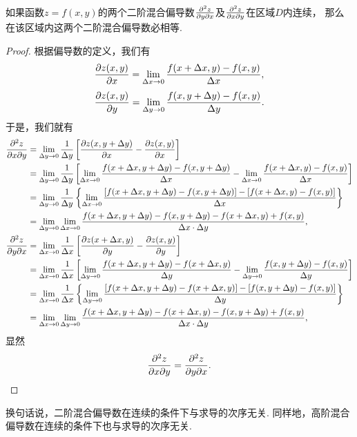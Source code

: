 \begin{theorem}
如果函数\(z=f(x,y)\)的两个二阶混合偏导数\(\pdv{z}{y}{x}\)及\(\pdv{z}{x}{y}\)在区域\(D\)内连续，
那么在该区域内这两个二阶混合偏导数必相等.
\begin{proof}
根据偏导数的定义，我们有
\[
	\pdv{z(x,y)}{x}
	= \lim\limits_{\Delta x\to0} \frac{f(x+\Delta x,y)-f(x,y)}{\Delta x},
\]
	\[
	\pdv{z(x,y)}{y}
	= \lim\limits_{\Delta y\to0} \frac{f(x,y+\Delta y)-f(x,y)}{\Delta y}.
\]
于是，我们就有
\begin{align*}
	\pdv[2]{z}{x}{y}
	&= \lim\limits_{\Delta y\to0}
		\frac{1}{\Delta y}\left[\pdv{z(x,y+\Delta y)}{x} - \pdv{z(x,y)}{x}\right] \\
	&= \lim\limits_{\Delta y\to0}
		\frac{1}{\Delta y}\left[\lim\limits_{\Delta x\to0} \frac{f(x+\Delta x,y+\Delta y)-f(x,y+\Delta y)}{\Delta x} - \lim\limits_{\Delta x\to0} \frac{f(x+\Delta x,y)-f(x,y)}{\Delta x}\right] \\
	&= \lim\limits_{\Delta y\to0}
		\frac{1}{\Delta y}\left\{\lim\limits_{\Delta x\to0} \frac{[f(x+\Delta x,y+\Delta y)-f(x,y+\Delta y)]-[f(x+\Delta x,y)-f(x,y)]}{\Delta x}\right\} \\
	&= \lim\limits_{\Delta y\to0} \lim\limits_{\Delta x\to0}
		\frac{f(x+\Delta x,y+\Delta y)-f(x,y+\Delta y)-f(x+\Delta x,y)+f(x,y)}{\Delta x \cdot \Delta y}, \\
	\pdv[2]{z}{y}{x}
	&= \lim\limits_{\Delta x\to0}
		\frac{1}{\Delta x}\left[\pdv{z(x+\Delta x,y)}{y} - \pdv{z(x,y)}{y}\right] \\
	&= \lim\limits_{\Delta x\to0}
		\frac{1}{\Delta x}\left[\lim\limits_{\Delta y\to0} \frac{f(x+\Delta x,y+\Delta y)-f(x+\Delta x,y)}{\Delta y} - \lim\limits_{\Delta y\to0} \frac{f(x,y+\Delta y)-f(x,y)}{\Delta y}\right] \\
	&= \lim\limits_{\Delta x\to0}
		\frac{1}{\Delta x}\left\{\lim\limits_{\Delta y\to0} \frac{[f(x+\Delta x,y+\Delta y)-f(x+\Delta x,y)]-[f(x,y+\Delta y)-f(x,y)]}{\Delta y}\right\} \\
	&= \lim\limits_{\Delta x\to0} \lim\limits_{\Delta y\to0}
		\frac{f(x+\Delta x,y+\Delta y)-f(x+\Delta x,y)-f(x,y+\Delta y)+f(x,y)}{\Delta x \cdot \Delta y}, \\
\end{align*}
显然\[
	\pdv[2]{z}{x}{y} = \pdv[2]{z}{y}{x}.
	\qedhere
\]
\end{proof}
\end{theorem}
换句话说，二阶混合偏导数在连续的条件下与求导的次序无关.
同样地，高阶混合偏导数在连续的条件下也与求导的次序无关.

